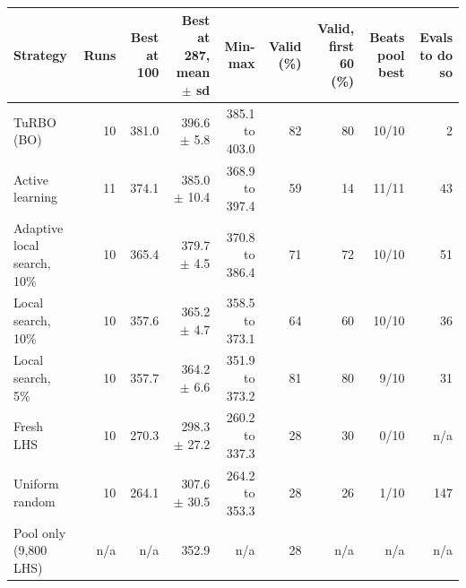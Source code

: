 \begin{tabular}{@{}lrrrrrrrr@{}}
\toprule
Strategy & Runs & Best at 100 & Best at 287, mean $\pm$ sd & Min-max & Valid (\%) & Valid, first 60 (\%) & Beats pool best & Evals to do so \\
\midrule
TuRBO (BO) & 10 & 381.0 & 396.6 $\pm$ 5.8 & 385.1 to 403.0 & 82 & 80 & 10/10 & 2 \\
Active learning & 11 & 374.1 & 385.0 $\pm$ 10.4 & 368.9 to 397.4 & 59 & 14 & 11/11 & 43 \\
Adaptive local search, 10\% & 10 & 365.4 & 379.7 $\pm$ 4.5 & 370.8 to 386.4 & 71 & 72 & 10/10 & 51 \\
Local search, 10\% & 10 & 357.6 & 365.2 $\pm$ 4.7 & 358.5 to 373.1 & 64 & 60 & 10/10 & 36 \\
Local search, 5\% & 10 & 357.7 & 364.2 $\pm$ 6.6 & 351.9 to 373.2 & 81 & 80 & 9/10 & 31 \\
Fresh LHS & 10 & 270.3 & 298.3 $\pm$ 27.2 & 260.2 to 337.3 & 28 & 30 & 0/10 & n/a \\
Uniform random & 10 & 264.1 & 307.6 $\pm$ 30.5 & 264.2 to 353.3 & 28 & 26 & 1/10 & 147 \\
\midrule
Pool only (9,800 LHS) & n/a & n/a & 352.9 & n/a & 28 & n/a & n/a & n/a \\
\bottomrule
\end{tabular}
